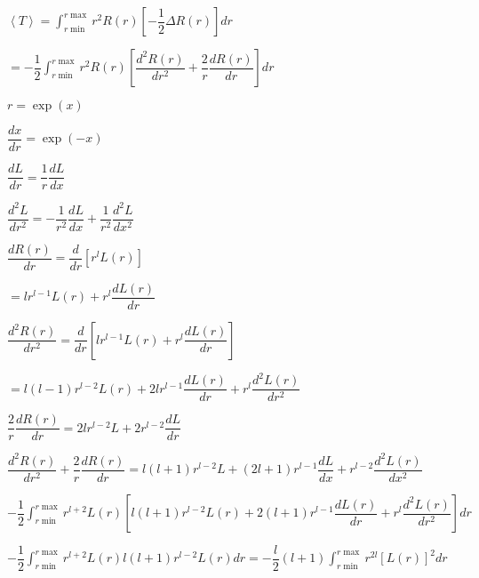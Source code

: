\documentclass{jarticle}%
\begin{document}
$\left\langle T\right\rangle =%
{\displaystyle\int\nolimits_{r\min}^{r\max}}
r^{2}R\left(  r\right)  \left[  -\dfrac{1}{2}\Delta R\left(  r\right)
\right]  dr$

$=-\dfrac{1}{2}%
{\displaystyle\int\nolimits_{r\min}^{r\max}}
r^{2}R\left(  r\right)  \left[  \dfrac{d^{2}R\left(  r\right)  }{dr^{2}%
}+\dfrac{2}{r}\dfrac{dR\left(  r\right)  }{dr}\right]  dr$

$r=\exp\left(  x\right)  $

$\dfrac{dx}{dr}=\exp\left(  -x\right)  $

$\dfrac{dL}{dr}=\dfrac{1}{r}\dfrac{dL}{dx}$

$\dfrac{d^{2}L}{dr^{2}}=-\dfrac{1}{r^{2}}\dfrac{dL}{dx}+\dfrac{1}{r^{2}}%
\dfrac{d^{2}L}{dx^{2}}$

$\dfrac{dR\left(  r\right)  }{dr}=\dfrac{d}{dr}\left[  r^{l}L\left(  r\right)
\right]  $

$=lr^{l-1}L\left(  r\right)  +r^{l}\dfrac{dL\left(  r\right)  }{dr}$

$\dfrac{d^{2}R\left(  r\right)  }{dr^{2}}=\dfrac{d}{dr}\left[  lr^{l-1}%
L\left(  r\right)  +r^{l}\dfrac{dL\left(  r\right)  }{dr}\right]  $

$=l\left(  l-1\right)  r^{l-2}L\left(  r\right)  +2lr^{l-1}\dfrac{dL\left(
r\right)  }{dr}+r^{l}\dfrac{d^{2}L\left(  r\right)  }{dr^{2}}$

$\dfrac{2}{r}\dfrac{dR\left(  r\right)  }{dr}=2lr^{l-2}L+2r^{l-2}\dfrac
{dL}{dr}$

$\dfrac{d^{2}R\left(  r\right)  }{dr^{2}}+\dfrac{2}{r}\dfrac{dR\left(
r\right)  }{dr}=l\left(  l+1\right)  r^{l-2}L+\left(  2l+1\right)
r^{l-1}\dfrac{dL}{dx}+r^{l-2}\dfrac{d^{2}L\left(  r\right)  }{dx^{2}}$

$-\dfrac{1}{2}%
{\displaystyle\int\nolimits_{r\min}^{r\max}}
r^{l+2}L\left(  r\right)  \left[  l\left(  l+1\right)  r^{l-2}L\left(
r\right)  +2\left(  l+1\right)  r^{l-1}\dfrac{dL\left(  r\right)  }{dr}%
+r^{l}\dfrac{d^{2}L\left(  r\right)  }{dr^{2}}\right]  dr$

$-\dfrac{1}{2}%
{\displaystyle\int\nolimits_{r\min}^{r\max}}
r^{l+2}L\left(  r\right)  l\left(  l+1\right)  r^{l-2}L\left(  r\right)
dr=-\dfrac{l}{2}\left(  l+1\right)
{\displaystyle\int\nolimits_{r\min}^{r\max}}
r^{2l}\left[  L\left(  r\right)  \right]  ^{2}dr$
\end{document}
